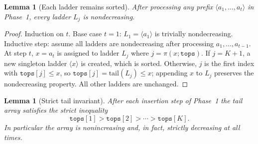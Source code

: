 \documentclass[12pt,a4paper]{article}
\theoremstyle{plain}
\newtheorem{lemma}[theorem]{Lemma}
\theoremstyle{definition}
\newcommand{\tops}{\texttt{tops}}
\begin{document}
\begin{lemma}[Each ladder remains sorted]
\label{lem:ladder_sorted}
After processing any prefix $\langle a_1, \dots, a_t \rangle$ in Phase~1,
every ladder $L_j$ is nondecreasing.
\end{lemma}

\begin{proof}
Induction on $t$.  Base case $t=1$: $L_1 = \langle a_1 \rangle$ is
trivially nondecreasing.  Inductive step: assume all ladders are
nondecreasing after processing $a_1, \dots, a_{t-1}$.  At step $t$,
$x = a_t$ is assigned to ladder $L_j$ where $j = \pi(x;\tops)$.  If
$j = K+1$, a new singleton ladder $\langle x \rangle$ is created, which
is sorted.  Otherwise, $j$ is the first index with $\tops[j] \le x$, so
$\tops[j] = \mathrm{tail}(L_j) \le x$; appending $x$ to $L_j$ preserves
the nondecreasing property.  All other ladders are unchanged.
\end{proof}

\begin{lemma}[Strict tail invariant]
\label{lem:tops_nonincreasing}
After each insertion step of Phase~1 the tail array satisfies the strict
inequality
\[ \tops[1] > \tops[2] > \cdots > \tops[K]. \]
In particular the array is nonincreasing and, in fact, strictly decreasing
at all times.
\end{lemma}
\end{document}
